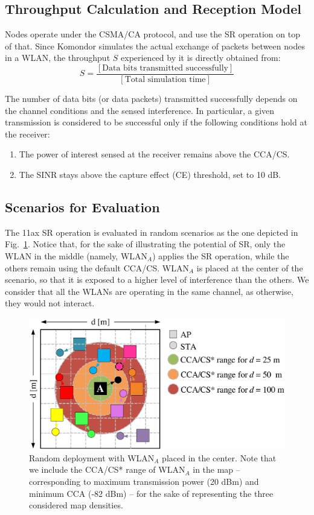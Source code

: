 \documentclass[conference]{IEEEtran}
\begin{document}
	\subsection{Throughput Calculation and Reception Model}
	
	Nodes operate under the CSMA/CA protocol, and use the SR operation on top of that. Since Komondor simulates the actual exchange of packets between nodes in a WLAN, the throughput $S$ experienced by it is directly obtained from:
	\begin{equation}
	S = \frac{[\text{Data bits transmitted successfully}]}{[\text{Total simulation time}]}
	\nonumber
	\end{equation}
	
	The number of data bits (or data packets) transmitted successfully depends on the channel conditions and the sensed interference. In particular, a given transmission is considered to be successful only if the following conditions hold at the receiver:
	\begin{enumerate}
		\item The power of interest sensed at the receiver remains above the CCA/CS.
		\item The SINR stays above the capture effect (CE) threshold, set to 10 dB.
	\end{enumerate}
	
	\subsection{Scenarios for Evaluation}
	
	The 11ax SR operation is evaluated in random scenarios as the one depicted in Fig.~\ref{fig:random_scenario}. Notice that, for the sake of illustrating the potential of SR, only the WLAN in the middle (namely, WLAN$_A$) applies the SR operation, while the others remain using the default CCA/CS. WLAN$_A$ is placed at the center of the scenario, so that it is exposed to a higher level of interference than the others. We consider that all the WLANs are operating in the same channel, as otherwise, they would not interact.
	
	\begin{figure}[ht!]
		\centering
		\includegraphics[width=\columnwidth]{map_central}
		\caption{Random deployment with WLAN$_A$ placed in the center. Note that we include the CCA/CS* range of WLAN$_A$ in the map -- corresponding to maximum transmission power (20 dBm) and minimum CCA (-82 dBm) -- for the sake of representing the three considered map densities.}
		\label{fig:random_scenario}
	\end{figure}
	
\end{document}

